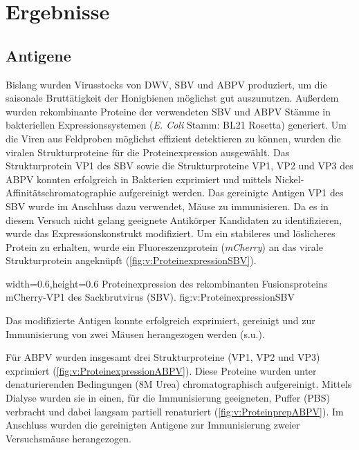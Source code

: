 \section{Ergebnisse}

\subsection{Antigene}

Bislang wurden Virusstocks von DWV, SBV und ABPV produziert, um die saisonale Bruttätigkeit der Honigbienen möglichst gut auszunutzen. Außerdem wurden rekombinante Proteine der verwendeten SBV und ABPV Stämme in bakteriellen Expressionssystemen (\textit{E. Coli} Stamm: BL21 Rosetta) generiert. Um die Viren aus Feldproben möglichst effizient detektieren zu können, wurden die viralen Strukturproteine für die Proteinexpression ausgewählt. 
Das Strukturprotein VP1 des SBV sowie die Strukturproteine VP1, VP2 und VP3 des ABPV konnten erfolgreich in Bakterien exprimiert und mittels Nickel-Affinitätschromatographie aufgereinigt werden. Das gereinigte Antigen VP1 des SBV wurde im Anschluss dazu verwendet, Mäuse zu immunisieren. Da es in diesem Versuch nicht gelang geeignete Antikörper Kandidaten zu identifizieren, wurde das Expressionskonstrukt modifiziert. Um ein stabileres und löslicheres Protein zu erhalten, wurde ein Fluoreszenzprotein (\textit{mCherry}) an das virale Strukturprotein angeknüpft (\cref{fig:v:ProteinexpressionSBV}).




{width=0.6\textwidth,height=0.6\textheight}
{Proteinexpression des rekombinanten Fusionsproteins mCherry-VP1 des Sackbrutvirus (SBV).}%
{}%
{fig:v:ProteinexpressionSBV}%

Das modifizierte Antigen konnte erfolgreich exprimiert, gereinigt und zur Immunisierung von zwei Mäusen herangezogen werden (s.u.). 

Für ABPV wurden insgesamt drei Strukturproteine (VP1, VP2 und VP3) exprimiert (\cref{fig:v:ProteinexpressionABPV}). Diese Proteine wurden unter denaturierenden Bedingungen (8M Urea) chromatographisch aufgereinigt. Mittels Dialyse wurden sie in einen, für die Immunisierung geeigneten, Puffer (PBS) verbracht und dabei langsam partiell renaturiert (\cref{fig:v:ProteinprepABPV}). Im Anschluss wurden die gereinigten Antigene zur Immunisierung zweier Versuchsmäuse herangezogen.

